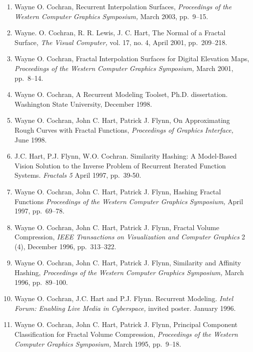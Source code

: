 \documentclass[10pt]{article}
\begin{document}
\begin{enumerate}

\item Wayne O. Cochran,
Recurrent Interpolation Surfaces,
{\em Proceedings of the Western Computer Graphics Symposium,}
March 2003, pp.~9--15.

\item Wayne. O. Cochran, R. R. Lewis, J. C. Hart,
The Normal of a Fractal Surface,
{\em The Visual Computer,} vol. 17, no. 4, April 2001, pp.~209--218.

\item Wayne O. Cochran,
Fractal Interpolation Surfaces for Digital Elevation Maps,
{\em Proceedings of the Western Computer Graphics Symposium,}
March 2001, pp.~8--14.

\item Wayne O. Cochran,
A Recurrent Modeling Toolset, Ph.D. dissertation.
Washington State University, December 1998.

\item
Wayne O. Cochran, John C. Hart, Patrick J. Flynn,
On Approximating Rough Curves with Fractal Functions,
{\em Proceedings of Graphics Interface,}
June 1998.

\item
J.C. Hart, P.J. Flynn, W.O. Cochran. 
Similarity Hashing: A Model-Based Vision Solution to the Inverse 
Problem of Recurrent Iterated Function Systems. 
{\em Fractals 5} April 1997, pp.~39-50.

\item
Wayne O. Cochran, John C. Hart, Patrick J. Flynn,
Hashing Fractal Functions
{\em Proceedings of the Western Computer Graphics Symposium,}
April 1997, pp.~69--78.

\item
Wayne O. Cochran, John C. Hart, Patrick J. Flynn,
Fractal Volume Compression,
{\em IEEE Transactions on Visualization and Computer Graphics}
2 (4),
December 1996, pp.~313--322.

\item
Wayne O. Cochran, John C. Hart, Patrick J. Flynn,
Similarity and Affinity Hashing,
{\em Proceedings of the Western Computer Graphics Symposium,}
March 1996, pp.~89--100.

\item
Wayne O. Cochran, J.C. Hart and P.J. Flynn. Recurrent Modeling. 
{\em Intel Forum: Enabling Live Media in Cyberspace,} 
invited poster. January 1996.

\item
Wayne O. Cochran, John C. Hart, Patrick J. Flynn,
Principal Component Classification for Fractal Volume Compression,
{\em Proceedings of the Western Computer Graphics Symposium,}
March 1995, \mbox{pp.~9--18}.

\end{enumerate}
\end{document}
